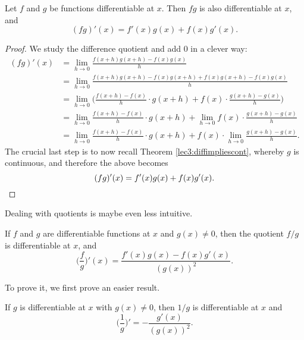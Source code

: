 \begin{theorem}
	Let $f$ and $g$ be functions differentiable at $x$.
	Then $f g$ is also differentiable at $x$, and
	\[
		(f g)'(x) = f'(x) g(x) + f(x) g'(x).
	\]
\end{theorem}

\begin{proof}
	We study the difference quotient and add $0$ in a clever way:
	\begin{align*}
		(f g)'(x) & = \lim_{h \to 0} \frac{f(x + h) g(x + h) - f(x) g(x)}{h}                                                         \\
		          & = \lim_{h \to 0} \frac{f(x + h) g(x + h) - f(x) g(x + h) + f(x) g(x + h) - f(x) g(x)}{h}                         \\
		          & = \lim_{h \to 0} \Big ( \frac{f(x + h) - f(x)}{h} \cdot g(x + h) + f(x) \cdot \frac{g(x + h) - g(x)}{h} \Big )   \\
		          & = \lim_{h \to 0} \frac{f(x + h) - f(x)}{h} \cdot g(x + h) + \lim_{h \to 0} f(x) \cdot \frac{g(x + h) - g(x)}{h}  \\
		          & = \lim_{h \to 0} \frac{f(x + h) - f(x)}{h} \cdot g(x + h) + f(x) \cdot \lim_{h \to 0} \frac{g(x + h) - g(x)}{h}.
	\end{align*}
	The crucial last step is to now recall Theorem \ref{lec3:diffimpliescont}, whereby $g$ is continuous, and therefore the above becomes
	\[
		(f g)'(x) = f'(x) g(x) + f(x) g'(x). \qedhere
	\]
\end{proof}

\noindent
Dealing with quotients is maybe even less intuitive.

\begin{theorem}
	If $f$ and $g$ are differentiable functions at $x$ and $g(x) \neq 0$, then the quotient $f / g$ is differentiable at $x$, and
	\[
		\Big ( \frac{f}{g} \Big )'(x) = \frac{f'(x) g(x) - f(x) g'(x)}{(g(x))^2}.
	\]
\end{theorem}

\noindent
To prove it, we first prove an easier result.

\begin{lemma}
	If $g$ is differentiable at $x$ with $g(x) \neq 0$, then $1 / g$ is differentiable at $x$ and
	\[
		\Big ( \frac{1}{g} \Big )' = -\frac{g'(x)}{(g(x))^2}.
	\]
\end{lemma}

